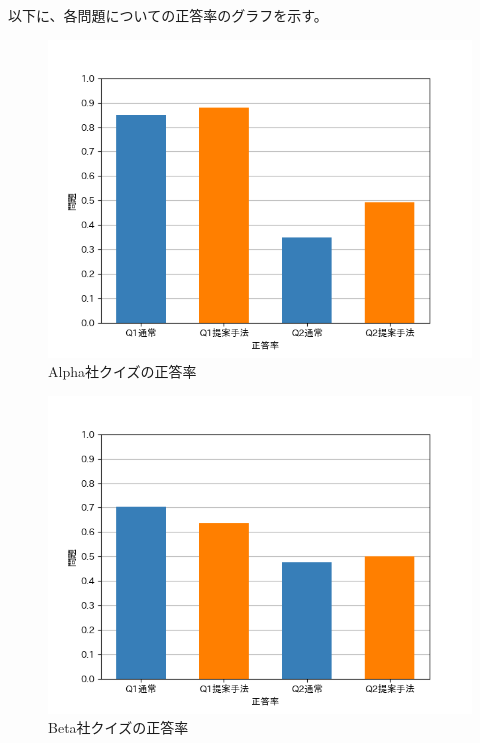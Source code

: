 以下に、各問題についての正答率のグラフを示す。
\begin{figure}[h]
  \begin{center}
      \includegraphics[width=13cm]{img/qgraphAlpha.png}
      \caption{Alpha社クイズの正答率}
      \label{img:Alpha社クイズの正答率}
  \end{center}
\end{figure}
\begin{figure}[h]
  \begin{center}
      \includegraphics[width=13cm]{img/qgraphBeta.png}
      \caption{Beta社クイズの正答率}
      \label{img:Beta社クイズの正答率}
  \end{center}
\end{figure}
